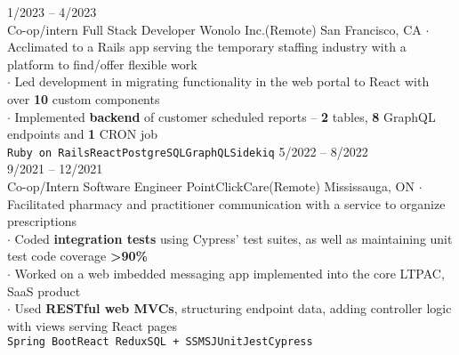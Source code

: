 \documentclass[8pt]{developercv} %
\begin{document}


\begin{minipage}[t]{\textwidth}
	\vspace{-\baselineskip} %

	\begin{entrylist}
		\entry
			{1/2023 -- 4/2023\\\footnotesize{Co-op/intern}}
			{Full Stack Developer}
			{Wonolo Inc.\slashsep (Remote) San Francisco, CA}
			{
				$\cdot$ Acclimated to a Rails app serving the temporary staffing industry with a platform to find/offer flexible work \\
        $\cdot$ Led development in migrating functionality in the web portal to React with over \textbf{10} custom components\\
				$\cdot$ Implemented \textbf{backend} of customer scheduled reports -- \textbf{2} tables, \textbf{8} GraphQL endpoints and \textbf{1} CRON job\\
				\texttt{Ruby on Rails}\slashsep\texttt{React}\slashsep\texttt{PostgreSQL}\slashsep\texttt{GraphQL}\slashsep\texttt{Sidekiq}
			}
		\entry
			{5/2022 -- 8/2022\\9/2021 -- 12/2021\\\footnotesize{Co-op/Intern}}
			{Software Engineer}
			{PointClickCare\slashsep (Remote) Mississauga, ON}
			{
				$\cdot$ Facilitated pharmacy and practitioner communication with a service to organize prescriptions\\
				$\cdot$ Coded \textbf{integration tests} using Cypress' test suites, as well as maintaining unit test code coverage \textbf{>90\%}\\
				$\cdot$ Worked on a web imbedded messaging app implemented into the core LTPAC, SaaS product\\
				$\cdot$ Used \textbf{RESTful web MVCs}, structuring endpoint data, adding controller logic with views serving React pages\\
				\texttt{Spring Boot}\slashsep\texttt{React Redux}\slashsep\texttt{SQL + SSMS}\slashsep\texttt{JUnit}\slashsep\texttt{Jest}\slashsep\texttt{Cypress}
			}
	\end{entrylist}
\end{minipage}
\end{document}
